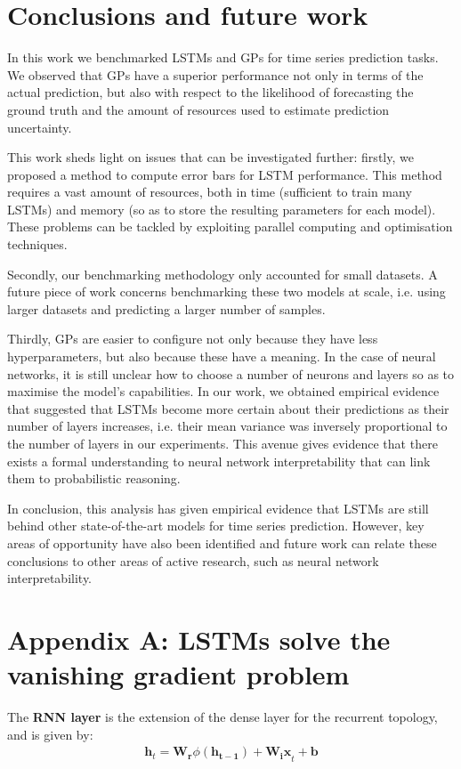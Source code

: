 \documentclass[pdftex,10pt,a4paper,journal]{article}
\theoremstyle{definition}
\theoremstyle{remark}
\newcommand*{\V}[1]{\mathbf{#1}}%
\begin{document}
\begin{multicols}{2}
\section{Conclusions and future work} \label{sec_conc}
In this work we benchmarked LSTMs and GPs for time series prediction tasks. We observed that GPs have a superior performance not only in terms of the actual prediction, but also with respect to the likelihood of forecasting the ground truth and the amount of resources used to estimate prediction uncertainty.
\par This work sheds light on issues that can be investigated further: firstly, we proposed a method to compute error bars for LSTM performance. This method requires a vast amount of resources, both in time (sufficient to train many LSTMs) and memory (so as to store the resulting parameters for each model). These problems can be tackled by exploiting parallel computing and optimisation techniques.
\par Secondly, our benchmarking methodology only accounted for small datasets. A future piece of work concerns benchmarking these two models at scale, i.e. using larger datasets and predicting a larger number of samples. 
\par Thirdly, GPs are easier to configure not only because they have less hyperparameters, but also because these have a meaning. In the case of neural networks, it is still unclear how to choose a number of neurons and layers so as to maximise the model's capabilities. In our work, we obtained empirical evidence that suggested that LSTMs become more certain about their predictions as their number of layers increases, i.e. their mean variance was inversely proportional to the number of layers in our experiments. This avenue gives evidence that there exists a formal understanding to neural network interpretability that can link them to probabilistic reasoning.
\par In conclusion, this analysis has given empirical evidence that LSTMs are still behind other state-of-the-art models for time series prediction. However, key areas of opportunity have also been identified and future work can relate these conclusions to other areas of active research, such as neural network interpretability.

\section*{Appendix A: LSTMs solve the vanishing gradient problem}\label{app:vanishing}
The \textbf{RNN layer} is the extension of the dense layer for the recurrent topology, and is given by:
\begin{align*}
    \V{h}_t = \V{W_r}\phi(\V{h_{t-1}}) + \V{W_ix}_t + \V{b}
\end{align*}



\end{multicols}
\end{document}
